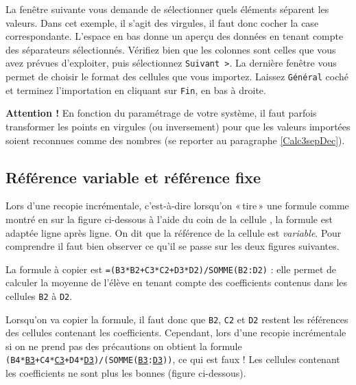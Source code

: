 La fenêtre suivante vous demande de sélectionner quels éléments séparent les valeurs.  Dans cet exemple, il s'agit des virgules, il faut donc cocher la case correspondante. L'espace en bas donne un aperçu des données en tenant compte des séparateurs sélectionnés.  Vérifiez bien que les colonnes sont celles que vous avez prévues d'exploiter, puis sélectionnez \texttt{Suivant >}. La dernière fenêtre vous permet de choisir le format des cellules que vous importez. Laissez \texttt{Général} coché et terminez l'importation en cliquant sur \texttt{Fin}, en bas à droite.





\textbf{Attention !} En fonction du paramétrage de votre système, il faut parfois transformer les points en virgules (ou inversement) pour que les valeurs importées soient reconnues comme des nombres (se reporter au paragraphe \vref{Calc3sepDec}).



\subsection{Référence variable et référence fixe}\label{Calc3reference} 

Lors d'une recopie incrémentale, c'est-à-dire lorsqu'on «\,tire\,» une formule comme montré en  sur la figure ci-dessous à l'aide du coin de la cellule , la formule est adaptée ligne après ligne. On dit que la référence de la cellule est \emph{variable}. Pour comprendre il faut bien observer ce qu'il se passe sur les deux figures suivantes.


La formule à copier est \texttt{=(B3*B2+C3*C2+D3*D2)/SOMME(B2:D2)} : elle permet de calculer la moyenne de l'élève en tenant compte des coefficients contenus dans les cellules \texttt{B2} à \texttt{D2}.

Lorsqu'on va copier la formule, il faut donc que \texttt{B2}, \texttt{C2} et \texttt{D2} restent les références des cellules contenant les coefficients. Cependant, lors d'une recopie incrémentale si on ne prend pas des précautions on obtient la formule \texttt{(B4*\underline{B3}+C4*\underline{C3}+D4*\underline{D3})/(SOMME(\underline{B3}:\underline{D3}))}, ce qui est faux ! Les cellules contenant les coefficients ne sont plus les bonnes (figure ci-dessous).

